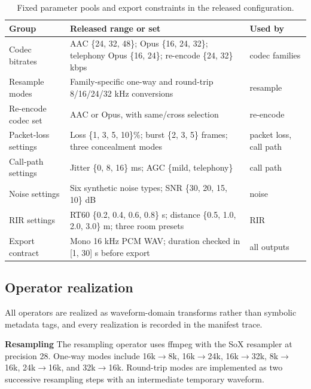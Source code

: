 \begin{table}[t]
\caption{Fixed parameter pools and export constraints in the released configuration.}
\label{tab:appendix_parameter_pools}
\centering
\small
\setlength{\tabcolsep}{5pt}
\renewcommand{\arraystretch}{1.10}
\begin{tabular}{@{}p{}p{}p{}@{}}
\toprule
\textbf{Group} & \textbf{Released range or set} & \textbf{Used by} \\
\midrule
Codec bitrates & AAC \{24, 32, 48\}; Opus \{16, 24, 32\}; telephony Opus \{16, 24\}; re-encode \{24, 32\} kbps & codec families \\
Resample modes & Family-specific one-way and round-trip 8/16/24/32 kHz conversions & resample \\
Re-encode codec set & AAC or Opus, with same/cross selection & re-encode \\
Packet-loss settings & Loss \{1, 3, 5, 10\}\%; burst \{2, 3, 5\} frames; three concealment modes & packet loss, call path \\
Call-path settings & Jitter \{0, 8, 16\} ms; AGC \{mild, telephony\} & call path \\
Noise settings & Six synthetic noise types; SNR \{30, 20, 15, 10\} dB & noise \\
RIR settings & RT60 \{0.2, 0.4, 0.6, 0.8\} s; distance \{0.5, 1.0, 2.0, 3.0\} m; three room presets & RIR \\
Export contract & Mono 16 kHz PCM WAV; duration checked in [1, 30] s before export & all outputs \\
\bottomrule
\end{tabular}
\end{table}

\subsection{Operator realization}

All operators are realized as waveform-domain transforms rather than symbolic metadata tags, and every realization is recorded in the manifest trace.

\noindent\textbf{Resampling} The resampling operator uses ffmpeg with the SoX resampler at precision 28. One-way modes include 16k$\rightarrow$8k, 16k$\rightarrow$24k, 16k$\rightarrow$32k, 8k$\rightarrow$16k, 24k$\rightarrow$16k, and 32k$\rightarrow$16k. Round-trip modes are implemented as two successive resampling steps with an intermediate temporary waveform.

